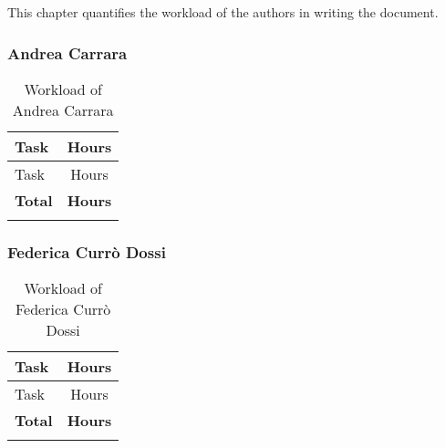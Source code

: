 This chapter quantifies the workload of the authors in writing the document.

\subsubsection{Andrea Carrara}
\renewcommand{\arraystretch}{1.5}
\begin{longtable}{|p{8.5cm}|c|}
    \hline \rowcolor{polimiblue!40}
    \textbf{Task} & \textbf{Hours} \\ \hline
    Task & Hours \\ \hline
    \hline \rowcolor{polimiblue!40}
    \textbf{Total} & \textbf{Hours} \\ \hline
\caption{Workload of Andrea Carrara}
\end{longtable}

\subsubsection{Federica Currò Dossi}
\renewcommand{\arraystretch}{1.5}
\begin{longtable}{|p{8.5cm}|c|}
    \hline \rowcolor{polimiblue!40}
    \textbf{Task} & \textbf{Hours} \\ \hline
    Task & Hours \\ \hline
    \hline \rowcolor{polimiblue!40}
    \textbf{Total} & \textbf{Hours} \\ \hline
\caption{Workload of Federica Currò Dossi}
\end{longtable}
